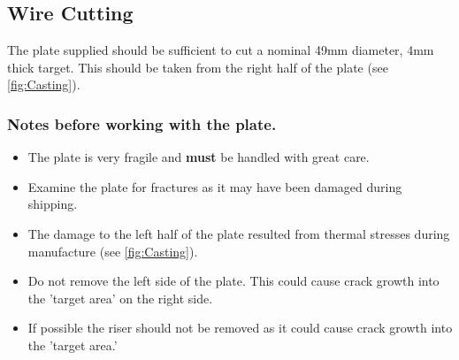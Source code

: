 \subsection{Wire Cutting}
The plate supplied should be sufficient to cut a nominal 49mm diameter, 4mm thick target. This should be taken from the right half of the plate (see \ref{fig:Casting}). 

\subsubsection{Notes before working with the plate.}
\begin{itemize}
\item The plate is very fragile and \textbf{must} be handled with great care. 
\item Examine the plate for fractures as it may have been damaged during shipping. 
\item The damage to the left half of the plate resulted from thermal stresses during manufacture (see \ref{fig:Casting}). 
\item Do not remove the left side of the plate. This could cause crack growth into the 'target area' on the right side.
\item If possible the riser should not be removed as it could cause crack growth into the 'target area.'
\end{itemize}